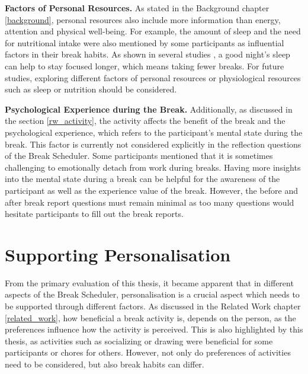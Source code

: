 \documentclass{hasel_thesis}
\begin{document}
\textbf{Factors of Personal Resources.} As stated in the Background chapter \ref{background}, personal resources also include more information than energy, attention and physical well-being. For example, the amount of sleep and the need for nutritional intake were also mentioned by some participants as influential factors in their break habits. As shown in several studies \cite{Rosekind.2010,Gingerich.2017,Choi.2018}, a good night's sleep can help to stay focused longer, which means taking fewer breaks. For future studies, exploring different factors of personal resources or physiological resources such as sleep or nutrition should be considered. 

\textbf{Psychological Experience during the Break.} Additionally, as discussed in the section \ref{rw_activity}, the activity affects the benefit of the break and the psychological experience, which refers to the participant's mental state during the break. This factor is currently not considered explicitly in the reflection questions of the Break Scheduler. Some participants mentioned that it is sometimes challenging to emotionally detach from work during breaks. Having more insights into the mental state during a break can be helpful for the awareness of the participant as well as the experience value of the break. However, the before and after break report questions must remain minimal as too many questions would hesitate participants to fill out the break reports.


\section{Supporting Personalisation} \label{supporting_personalisation}
From the primary evaluation of this thesis, it became apparent that in different aspects of the Break Scheduler, personalisation is a crucial aspect which needs to be supported through different factors. As discussed in the Related Work chapter \ref{related_work}, how beneficial a break activity is, depends on the person, as the preferences influence how the activity is perceived. This is also highlighted by this thesis, as activities such as socializing or drawing were beneficial for some participants or chores for others. However, not only do preferences of activities need to be considered, but also break habits can differ.
\end{document}

